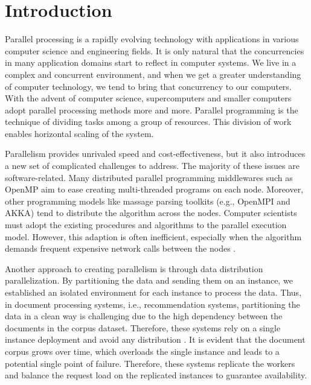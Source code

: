 \chapter{Introduction}

Parallel processing is a rapidly evolving technology with applications in various computer science and engineering fields. It is only natural that the concurrencies in many application domains start to reflect in computer systems. We live in a complex and concurrent environment, and when we get a greater understanding of computer technology, we tend to bring that concurrency to our computers. With the advent of computer science, supercomputers and smaller computers adopt parallel processing methods more and more. Parallel programming is the technique of dividing tasks among a group of resources. This division of work enables horizontal scaling of the system.


Parallelism provides unrivaled speed and cost-effectiveness, but it also introduces a new set of complicated challenges to address. The majority of these issues are software-related. Many distributed parallel programming middlewares such as OpenMP aim to ease creating multi-threaded programs on each node. Moreover, other programming models like massage parsing toolkits (e.g., OpenMPI and AKKA) tend to distribute the algorithm across the nodes. Computer scientists must adopt the existing procedures and algorithms to the parallel execution model. However, this adaption is often inefficient, especially when the algorithm demands frequent expensive network calls between the nodes \cite{sharmaGraphJetRealtimeContent2016, eksombatchaiPixieSystemRecommending2018}.


Another approach to creating parallelism is through data distribution parallelization. By partitioning the data and sending them on an instance, we established an isolated environment for each instance to process the data. Thus, in document processing systems, i.e., recommendation systems, partitioning the data in a clean way is challenging due to the high dependency between the documents in the corpus dataset. Therefore, these systems rely on a single instance deployment and avoid any distribution \cite{guptaWTFWhoFollow2013,sharmaGraphJetRealtimeContent2016, eksombatchaiPixieSystemRecommending2018}. It is evident that the document corpus grows over time, which overloads the single instance and leads to a potential single point of failure. Therefore, these systems replicate the workers and balance the request load on the replicated instances to guarantee availability.


